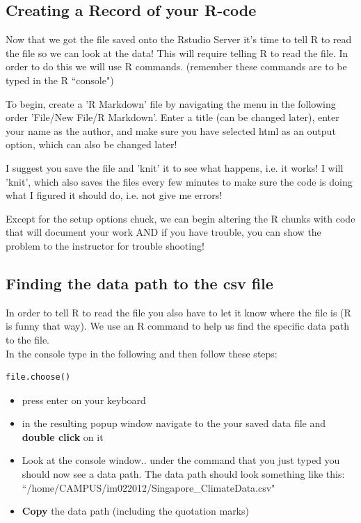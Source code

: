 \documentclass{article}\usepackage[]{graphicx}\usepackage[]{color}
\begin{document}
\subsection{Creating a Record of your R-code}

Now that we got the file saved onto the Rstudio Server it's time to tell R to read the file so we can look at the data! This will require telling R to read the file. In order to do this we will use R commands. (remember these commands are to be typed in the R ``console") %

To begin, create a 'R Markdown' file by navigating the menu in the following order 'File/New File/R Markdown'. Enter a title (can be changed later), enter your name as the author, and make sure you have selected html as an output option, which can also be changed later! 

I suggest you save the file and 'knit' it to see what happens, i.e. it works!  I will 'knit', which also saves the files every few minutes to make sure the code is doing what I figured it should do, i.e. not give me errors!

Except for the setup options chuck, we can begin altering the R chunks with code that will document your work AND if you have trouble, you can show the problem to the instructor for trouble shooting!

 \subsection{Finding the data path to the csv file}
In order to tell R to read the file you also have to let it know where the file is (R is funny that way). We use an R command to help us find the specific data path to the file. \\
In the console type in the following and then follow these steps: 
\begin{verbatim}
file.choose()
\end{verbatim}

\begin{itemize} 
\item press enter on your keyboard
\item in the resulting popup window navigate to the your saved data file and \textbf{double click} on it
\item Look at the console window.. under the command that you just typed you should now see a data path. The data path should look something like this: ``/home/CAMPUS/im022012/Singapore\_ClimateData.csv"  %

\item \textbf{Copy} the data path (including the quotation marks)
\end{itemize}
\end{document}
